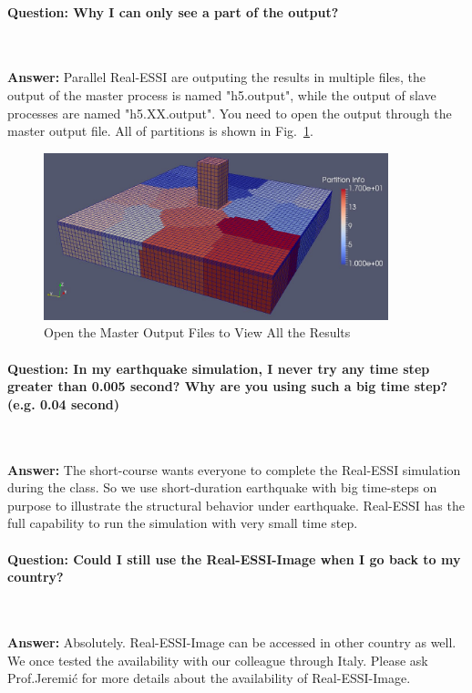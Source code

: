 \paragraph{Question: Why I can only see a part of the output?} ~

\textbf{Answer:} 
Parallel Real-ESSI are outputing the results in multiple files, the output of the master process is named "h5.output", while the output of slave processes are named "h5.XX.output". You need to open the output through the master output file.
All of partitions is shown in Fig.~\ref{fig_Specify_storage_model}.
\begin{figure}[H]
  \centering
  \includegraphics[width = 10cm]{./Figure-files/QA/Partition_info.png}
  \caption{Open the Master Output Files to View All the Results}
  \label{fig_Specify_storage_model}
\end{figure}




\paragraph{Question: In my earthquake simulation, I never try any time step greater than 0.005 second? Why are you using such a big time step? (e.g. 0.04 second)} ~

\textbf{Answer:} 
The short-course wants everyone to complete the Real-ESSI simulation during the class. So we use short-duration earthquake with big time-steps on purpose to illustrate the structural behavior under earthquake. Real-ESSI has the full capability to run the simulation with very small time step.


\paragraph{Question: Could I still use the Real-ESSI-Image when I go back to my country?} ~

\textbf{Answer:} 
Absolutely. Real-ESSI-Image can be accessed in other country as well. We once tested the availability with our colleague through Italy. Please ask Prof.Jeremi{\'c} for more details about the availability of Real-ESSI-Image.


